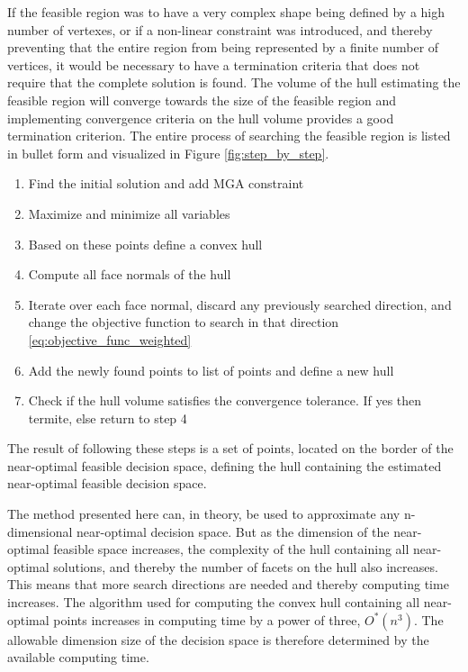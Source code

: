 If the feasible region was to have a very complex shape being defined by a high number of vertexes, or if a non-linear constraint was introduced, and thereby preventing that the entire region from being represented by a finite number of vertices, it would be necessary to have a termination criteria that does not require that the complete solution is found. The volume of the hull estimating the feasible region will converge towards the size of the feasible region and implementing convergence criteria on the hull volume provides a good termination criterion. The entire process of searching the feasible region is listed in bullet form and visualized in Figure \ref{fig:step_by_step}.


\begin{enumerate}
	\item Find the initial solution and add MGA constraint 
	\item Maximize and minimize all variables
	\item Based on these points define a convex hull 
	\item Compute all face normals of the hull
	\item Iterate over each face normal, discard any previously searched direction, and change the objective function to search in that direction \ref{eq:objective_func_weighted}
	\item Add the newly found points to list of points and define a new hull
	\item Check if the hull volume satisfies the convergence tolerance. If yes then termite, else return to step 4 
\end{enumerate}

The result of following these steps is a set of points, located on the border of the near-optimal feasible decision space, defining the hull containing the estimated near-optimal feasible decision space. 

The method presented here can, in theory, be used to approximate any n-dimensional near-optimal decision space. But as the dimension of the near-optimal feasible space increases, the complexity of the hull containing all near-optimal solutions, and thereby the number of facets on the hull also increases. This means that more search directions are needed and thereby computing time increases. The algorithm used for computing the convex hull containing all near-optimal points increases in computing time by a power of three, $O^*(n^3)$. The allowable dimension size of the decision space is therefore determined by the available computing time. 


